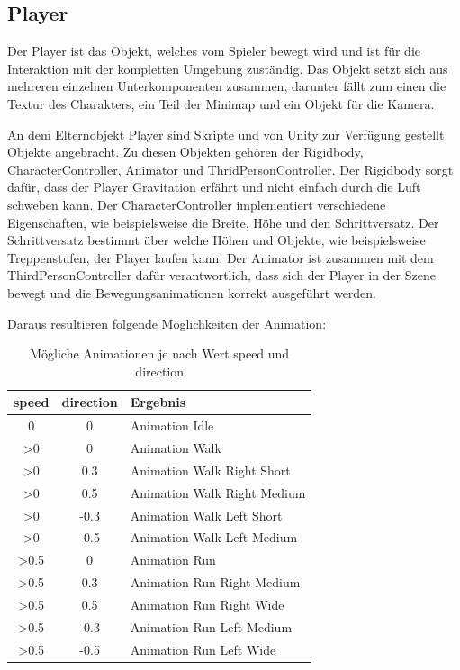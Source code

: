		\subsection{Player}
			Der Player ist das Objekt, welches vom Spieler bewegt wird und ist für die Interaktion mit der kompletten Umgebung zuständig. Das Objekt setzt sich aus mehreren einzelnen Unterkomponenten zusammen, darunter fällt zum einen die Textur des Charakters, ein Teil der Minimap und ein Objekt für die Kamera. 
	
			An dem Elternobjekt Player sind Skripte und von Unity zur Verfügung gestellt Objekte angebracht. Zu diesen Objekten gehören der Rigidbody, CharacterController, Animator und ThridPersonController. Der Rigidbody sorgt dafür, dass der Player Gravitation erfährt und nicht einfach durch die Luft schweben kann. Der CharacterController implementiert verschiedene Eigenschaften, wie beispielsweise die Breite, Höhe und den Schrittversatz. Der Schrittversatz bestimmt über welche Höhen und Objekte, wie beispielsweise Treppenstufen, der Player laufen kann. Der Animator ist zusammen mit dem ThirdPersonController dafür verantwortlich, dass sich der Player in der Szene bewegt und die Bewegungsanimationen korrekt ausgeführt werden. 
	
			Daraus resultieren folgende Möglichkeiten der Animation:

 \begin{table}[htbp]
 \centering
 \begin{tabular}{|c|c|l|}
 \hline
  speed & direction & Ergebnis \\
 \hline
  0 & 0 & Animation Idle \\
  >0 & 0 & Animation Walk \\
  >0 & 0.3 & Animation Walk Right Short \\
  >0 & 0.5 & Animation Walk Right Medium \\
  >0 & -0.3 & Animation Walk Left Short \\
  >0 & -0.5 & Animation Walk Left Medium \\
  >0.5 & 0 & Animation Run \\
  >0.5 & 0.3 & Animation Run Right Medium \\
  >0.5 & 0.5 & Animation Run Right Wide \\
  >0.5 & -0.3 & Animation Run Left Medium \\
  >0.5 & -0.5 & Animation Run Left Wide \\ \hline
 \end{tabular}
  \caption{Mögliche Animationen je nach Wert speed und direction}
 \label{tab:tabspeeddirection}
 \end{table}
 
